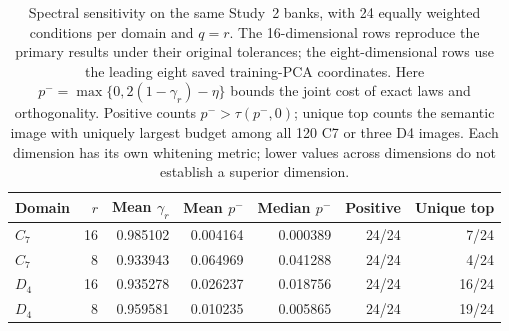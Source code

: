 \begin{table}[htbp]
\centering\small
\setlength{\tabcolsep}{3pt}
\begin{tabular}{@{}lrrrrrr@{}}
\toprule
Domain & $r$ & Mean $\gamma_r$ & Mean $p^-$ & Median $p^-$ & Positive & Unique top \\
\midrule
$C_7$ & 16 & 0.985102 & 0.004164 & 0.000389 & 24/24 & 7/24 \\
$C_7$ & 8 & 0.933943 & 0.064969 & 0.041288 & 24/24 & 4/24 \\
\addlinespace
$D_4$ & 16 & 0.935278 & 0.026237 & 0.018756 & 24/24 & 16/24 \\
$D_4$ & 8 & 0.959581 & 0.010235 & 0.005865 & 24/24 & 19/24 \\
\bottomrule
\end{tabular}
\caption{Spectral sensitivity on the same Study~2 banks, with 24 equally weighted conditions per domain and $q=r$. The 16-dimensional rows reproduce the primary results under their original tolerances; the eight-dimensional rows use the leading eight saved training-PCA coordinates. Here $p^-=\max\{0,2(1-\gamma_r)-\eta\}$ bounds the joint cost of exact laws and orthogonality. Positive counts $p^->\tau(p^-,0)$; unique top counts the semantic image with uniquely largest budget among all 120 C7 or three D4 images. Each dimension has its own whitening metric; lower values across dimensions do not establish a superior dimension.}
\label{tab:spectral-dimension-sensitivity}
\end{table}
